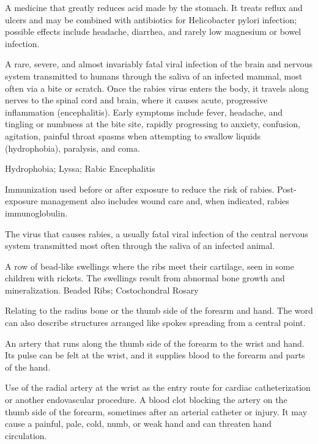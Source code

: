  A medicine that greatly reduces acid made by the stomach. It treats reflux and ulcers and may be combined with antibiotics for Helicobacter pylori infection; possible effects include headache, diarrhea, and rarely low magnesium or bowel infection.

 A rare, severe, and almost invariably fatal viral infection of the brain and nervous system transmitted to humans through the saliva of an infected mammal, most often via a bite or scratch. Once the rabies virus enters the body, it travels along nerves to the spinal cord and brain, where it causes acute, progressive inflammation (encephalitis). Early symptoms include fever, headache, and tingling or numbness at the bite site, rapidly progressing to anxiety, confusion, agitation, painful throat spasms when attempting to swallow liquids (hydrophobia), paralysis, and coma.

\synonyms
Hydrophobia; Lyssa; Rabic Encephalitis

 Immunization used before or after exposure to reduce the risk of rabies. Post-exposure management
also includes wound care and, when indicated, rabies immunoglobulin.

 The virus that causes rabies, a usually fatal viral infection of the central nervous system transmitted most often through the saliva of an infected animal.

 A row of bead-like swellings where the ribs meet their cartilage, seen in some children with rickets. The swellings result from abnormal bone growth and mineralization.
\synonyms
Beaded Ribs; Costochondral Rosary

 Relating to the radius bone or the thumb side of the forearm and hand. The word can also describe structures arranged like spokes spreading from a central point.

 An artery that runs along the thumb side of the forearm to the wrist and hand. Its pulse can be felt at the wrist, and it supplies blood to the forearm and parts of the hand.

 Use of the radial artery at the wrist as the entry route for cardiac catheterization or another endovascular procedure.
 A blood clot blocking the artery on the thumb side of the forearm, sometimes after an arterial catheter or injury. It may cause a painful, pale, cold, numb, or weak hand and can threaten hand circulation.

